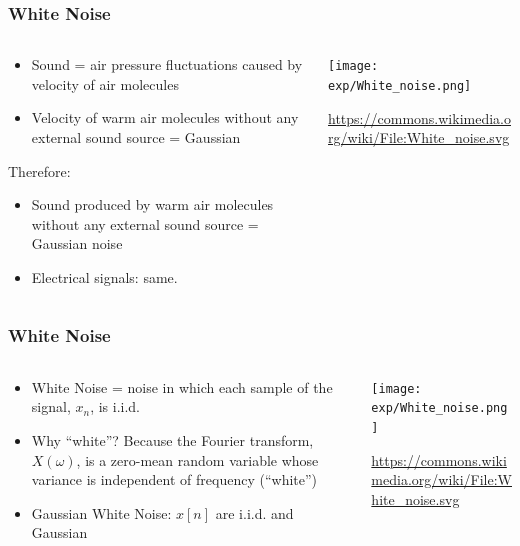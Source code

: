 \documentclass{beamer}
\begin{document}
\begin{frame}
  \frametitle{White Noise}
  
  \begin{columns}
    \begin{column}{0.5\textwidth}
      \begin{itemize}
        \item Sound = air pressure fluctuations caused by velocity of air molecules
        \item Velocity of warm air molecules without any external sound source = Gaussian
      \end{itemize}
      Therefore:
      \begin{itemize}
      \item Sound produced by warm air molecules without any external sound source = Gaussian noise
      \item Electrical signals: same.
      \end{itemize}
    \end{column}
    \begin{column}{0.5\textwidth}
      \centerline{\texttt{[image: exp/White\_noise.png]}}

      \url{https://commons.wikimedia.org/wiki/File:White_noise.svg}
    \end{column}
  \end{columns}
\end{frame}

\begin{frame}
  \frametitle{White Noise}
  
  \begin{columns}
    \begin{column}{0.5\textwidth}
      \begin{itemize}
        \item White Noise = noise in which each sample of the signal, $x_n$, is i.i.d.
        \item Why ``white''?  Because the Fourier transform,
          $X(\omega)$, is a zero-mean random variable whose variance
          is independent of frequency (``white'')
        \item 
          Gaussian White Noise:
          $x[n]$ are i.i.d. and Gaussian
      \end{itemize}
    \end{column}
    \begin{column}{0.5\textwidth}
      \centerline{\texttt{[image: exp/White\_noise.png]}}

      \url{https://commons.wikimedia.org/wiki/File:White_noise.svg}
    \end{column}
  \end{columns}
\end{frame}
\end{document}
